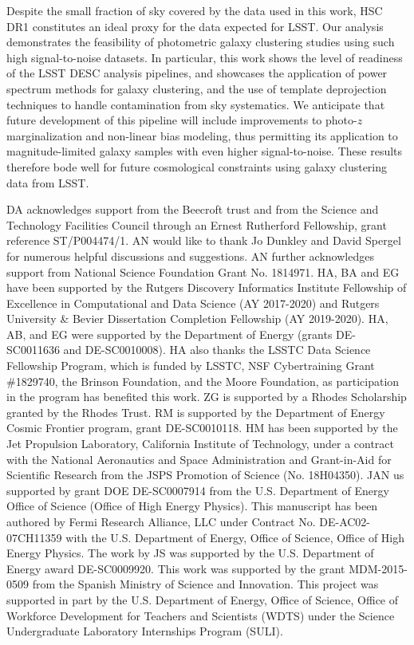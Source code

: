 \documentclass[a4paper,11pt]{article}
\begin{document}
  Despite the small fraction of sky covered by the data used in this work, HSC DR1 constitutes an ideal proxy for the data expected for LSST. Our analysis demonstrates the feasibility of photometric galaxy clustering studies using such high signal-to-noise datasets. In particular, this work shows the level of readiness of the LSST DESC analysis pipelines, and showcases the application of power spectrum methods for galaxy clustering, and the use of template deprojection techniques to handle contamination from sky systematics. We anticipate that future development of this pipeline will include improvements to photo-$z$ marginalization and non-linear bias modeling, thus permitting its application to magnitude-limited galaxy samples with even higher signal-to-noise. These results therefore bode well for future cosmological constraints using galaxy clustering data from LSST.


\acknowledgments
  DA acknowledges support from the Beecroft trust and from the Science and Technology Facilities Council through an Ernest Rutherford Fellowship, grant reference ST/P004474/1.
  AN would like to thank Jo Dunkley and David Spergel for numerous helpful discussions and suggestions. AN further acknowledges support from National Science Foundation Grant No. 1814971.
  HA, BA and EG have been supported by the Rutgers Discovery Informatics Institute Fellowship of Excellence in Computational and Data Science (AY 2017-2020) and Rutgers University \& Bevier Dissertation Completion Fellowship (AY 2019-2020).
  HA, AB, and EG were supported by the Department of Energy (grants DE-SC0011636 and DE-SC0010008).
  HA also thanks the LSSTC Data Science Fellowship Program, which is funded by LSSTC, NSF Cybertraining Grant \#1829740, the Brinson Foundation, and the Moore Foundation, as participation in the program has benefited this work.
  ZG is supported by a Rhodes Scholarship granted by the Rhodes Trust.
  RM is supported by the Department of Energy Cosmic Frontier program, grant DE-SC0010118.
  HM has been supported by the Jet Propulsion Laboratory, California Institute of Technology, under a contract with the National Aeronautics and Space Administration and Grant-in-Aid for Scientific Research from the JSPS Promotion of Science (No. 18H04350). 
  JAN us supported by grant DOE DE-SC0007914 from the U.S. Department of Energy Office of Science (Office of High Energy Physics).
  This manuscript has been authored by Fermi Research Alliance, LLC under Contract No. DE-AC02-07CH11359 with the U.S. Department of Energy, Office of Science, Office of High Energy Physics.
  The work by JS was supported by the U.S. Department of Energy award DE-SC0009920.
  This work was supported by the grant MDM-2015-0509 from the Spanish Ministry of Science and Innovation.
  This project was supported in part by the U.S. Department of Energy, Office of Science, Office of Workforce Development for Teachers and Scientists (WDTS) under the Science Undergraduate Laboratory Internships Program (SULI).
\end{document}
